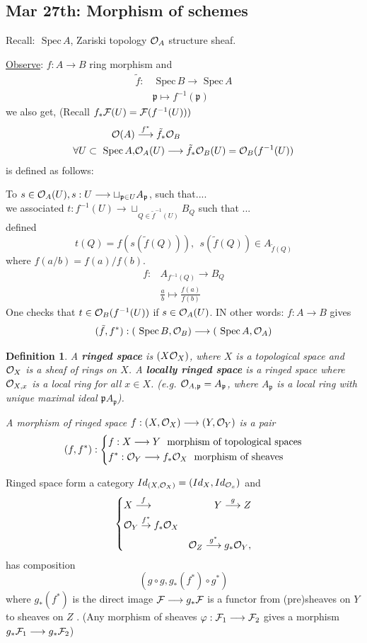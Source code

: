 \documentclass[11pt]{article}
\newtheorem{dfn}[thm]{Definition}
\newcommand{\spec}{\text{ Spec}\,}
\newcommand{\scp}{{\mathfrak p}}
\newcommand{\calf}{{\cal F}}
\newcommand{\calo}{{\cal O}}
\newcommand{\rta}{\rightarrow}
\newcommand{\lrta}{\longrightarrow}
\begin{document}
\subsection{Mar 27th: Morphism of schemes}
Recall: $\spec A$, Zariski topology $\calo_A$ structure sheaf.

\underline{Observe}: 
$f:A\lrta B$ ring morphism and 
$$
\begin{aligned}
\tilde{f}:&\spec B\lrta \spec A\\
& \scp\longmapsto f^{-1}(\scp)
\end{aligned}
$$
we also get, (Recall $f_*\calf(U)=\calf(f^{-1}(U)))$
$$
\begin{aligned}
\calo(A) &\overset{f^*}{\lrta}  \tilde{f}_*\calo_B \\
\forall U\subset \spec A, &\calo_A(U)\lrta \tilde{f}_*\calo_B(U)=\calo_B(f^{-1}(U))
\end{aligned}
$$
is defined as follows:

To $s\in \calo_A(U), s:U\lrta \sqcup_{\scp\in U}A_\scp$, such that....\\
we associated $t:f^{-1}(U)\lrta \sqcup_{Q\in\tilde{f}^{-1}(U)}B_Q$  such that ...\\
defined 
$$
t(Q)=f(s(\tilde{f}(Q))), \ \ s(\tilde{f}(Q))\in A_{\tilde{f}(Q)}
$$
where $f(a/b)=f(a)/f(b)$.
$$\begin{aligned}
f:&A_{f^{-1}(Q)}\lrta B_Q\\
& \frac{a}{b}\longmapsto \frac{f(a)}{f(b)}
\end{aligned}
$$
One checks that $t\in\calo_B(f^{-1}(U))$ if $s\in \calo_A(U)$. IN other words: $f:A\lrta B$ gives 
$$
(\tilde{f},f^*): (\spec B,\calo_B)\lrta (\spec A,\calo_A)
$$
\begin{dfn}
A \textbf{ringed space} is $(X\calo_X)$, where $X$ is a topological space and $\calo_X$ is a sheaf of rings  on $X$. A \textbf{locally ringed space} is a ringed space where $\calo_{X,x}$ is a local ring for all $x\in X$. (e.g. $\calo_{A,\scp}=A_\scp$, where $A_\scp$ is a local ring with unique maximal ideal $\scp A_\scp$).

A morphism of ringed space $f:(X,\calo_X)\lrta (Y,\calo_Y)$ is a pair
$$
(f,f^*):\left\{\begin{aligned}
&f:X\lrta Y \ \text{  morphism of topological spaces}\\ 
& f^*:\calo_Y\lrta f_*\calo_X\ \text{ morphism of sheaves}
\end{aligned}
\right.
$$ 
\end{dfn}
Ringed space form a category $Id_{(X,\calo_X)}=(Id_X,Id_{\calo_x})$ and 
$$
\left\{\begin{aligned}
& X\overset{f}{\lrta }&Y\overset{g}{\lrta} Z\\
& \calo_Y\overset{f^*}{\rta}f_*\calo_X&\\
&& \calo_Z\overset{g^*}{\lrta}g_*\calo_Y,
\end{aligned}\right.
$$
has composition
$$
(g\circ g,g_*(f^*)\circ g^*)
$$
where $g_*(f^*)$ is the direct image $\calf\lrta g_*\calf$ is a functor from (pre)sheaves on $Y$ to sheaves on $Z$
.
(Any morphism of sheaves $\varphi:\calf_1\lrta \calf_2$ gives a morphism $g_*\calf_1\lrta g_*\calf_2$)
\end{document}
